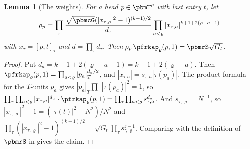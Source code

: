 \documentclass[10pt]{amsart}
\newtheorem{lemma}[theorem]{Lemma}
\theoremstyle{definition}
\theoremstyle{remark}
\begin{document}
\begin{lemma}[The weights]\label{pff:weights}
For a head $p\in\pbmT^\varrho$ with last entry $t$, let
\[
\rho_p=\prod_\tau\frac{\sqrt{\pbmcG}(|x_{\tau,\varrho}|^2-1)^{(k-1)/2}}
{d_\tau}\prod_{a<\varrho}|x_{\tau,a}|^{k+1+2(\varrho-a-1)}
\]
with $x_\tau=[p,t]_\tau$ and $d=\prod_\tau d_\tau$. Then
$\rho_p\,\pfrkap_\varrho(p,1)=\pbmrS\sqrt{G_t}$.
\end{lemma}
\begin{proof}
Put $d_a=k+1+2(\varrho-a-1)=k-1+2(\varrho-a)$. Then $\pfrkap_\varrho(p,1)=\prod_{a<\varrho}|p_a|_T^{d_a/2}$, and $|x_{\tau,a}|=
s_{\tau,a}|\tau(p_a)|$. The product formula for the $T$-units $p_a$ gives $|p_a|_T\prod_\tau|\tau(p_a)|^2=1$, so
$\prod_\tau\prod_{a<\varrho}|x_{\tau,a}|^{d_a}\cdot\pfrkap_\varrho(p,1)=\prod_\tau\prod_{a<\varrho}s_{\tau,a}^{d_a}$. And $s_{\tau,\varrho}=
N^{-1}$, so $|x_{\tau,\varrho}|^2-1=(|\tau(t)|^2-N^2)/N^2$ and $\prod_\tau(|x_{\tau,\varrho}|^2-1)^{(k-1)/2}=\sqrt{G_t}
\prod_\tau s_{\tau,\varrho}^{k-1}$. Comparing with the definition of $\pbmrS$ in {\cite[(40)]{P51}} gives the
claim.
\end{proof}
\end{document}
